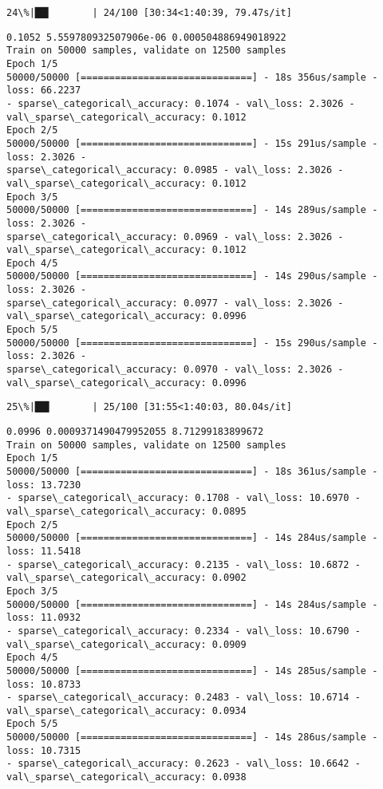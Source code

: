 \documentclass[11pt]{article}
\begin{document}
    \begin{Verbatim}[commandchars=\\\{\}]
 24\%|██▍       | 24/100 [30:34<1:40:39, 79.47s/it]
    \end{Verbatim}

    \begin{Verbatim}[commandchars=\\\{\}]
0.1052 5.559780932507906e-06 0.000504886949018922
Train on 50000 samples, validate on 12500 samples
Epoch 1/5
50000/50000 [==============================] - 18s 356us/sample - loss: 66.2237
- sparse\_categorical\_accuracy: 0.1074 - val\_loss: 2.3026 -
val\_sparse\_categorical\_accuracy: 0.1012
Epoch 2/5
50000/50000 [==============================] - 15s 291us/sample - loss: 2.3026 -
sparse\_categorical\_accuracy: 0.0985 - val\_loss: 2.3026 -
val\_sparse\_categorical\_accuracy: 0.1012
Epoch 3/5
50000/50000 [==============================] - 14s 289us/sample - loss: 2.3026 -
sparse\_categorical\_accuracy: 0.0969 - val\_loss: 2.3026 -
val\_sparse\_categorical\_accuracy: 0.1012
Epoch 4/5
50000/50000 [==============================] - 14s 290us/sample - loss: 2.3026 -
sparse\_categorical\_accuracy: 0.0977 - val\_loss: 2.3026 -
val\_sparse\_categorical\_accuracy: 0.0996
Epoch 5/5
50000/50000 [==============================] - 15s 290us/sample - loss: 2.3026 -
sparse\_categorical\_accuracy: 0.0970 - val\_loss: 2.3026 -
val\_sparse\_categorical\_accuracy: 0.0996
    \end{Verbatim}

    \begin{Verbatim}[commandchars=\\\{\}]
 25\%|██▌       | 25/100 [31:55<1:40:03, 80.04s/it]
    \end{Verbatim}

    \begin{Verbatim}[commandchars=\\\{\}]
0.0996 0.0009371490479952055 8.71299183899672
Train on 50000 samples, validate on 12500 samples
Epoch 1/5
50000/50000 [==============================] - 18s 361us/sample - loss: 13.7230
- sparse\_categorical\_accuracy: 0.1708 - val\_loss: 10.6970 -
val\_sparse\_categorical\_accuracy: 0.0895
Epoch 2/5
50000/50000 [==============================] - 14s 284us/sample - loss: 11.5418
- sparse\_categorical\_accuracy: 0.2135 - val\_loss: 10.6872 -
val\_sparse\_categorical\_accuracy: 0.0902
Epoch 3/5
50000/50000 [==============================] - 14s 284us/sample - loss: 11.0932
- sparse\_categorical\_accuracy: 0.2334 - val\_loss: 10.6790 -
val\_sparse\_categorical\_accuracy: 0.0909
Epoch 4/5
50000/50000 [==============================] - 14s 285us/sample - loss: 10.8733
- sparse\_categorical\_accuracy: 0.2483 - val\_loss: 10.6714 -
val\_sparse\_categorical\_accuracy: 0.0934
Epoch 5/5
50000/50000 [==============================] - 14s 286us/sample - loss: 10.7315
- sparse\_categorical\_accuracy: 0.2623 - val\_loss: 10.6642 -
val\_sparse\_categorical\_accuracy: 0.0938
    \end{Verbatim}
\end{document}
